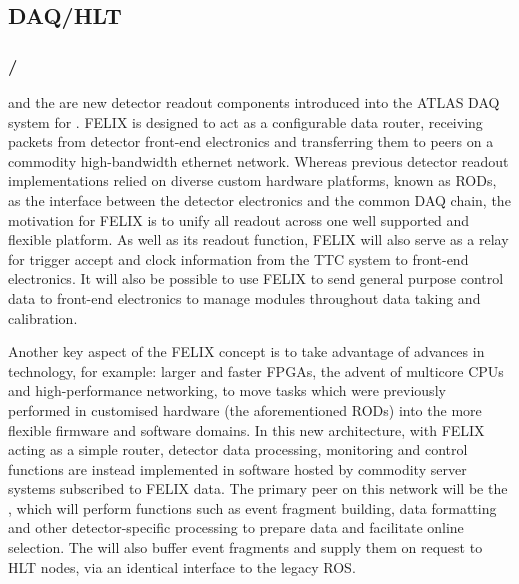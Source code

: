 \documentclass[cernpreprint, atlasdraft=false, UKenglish,british,orcidlogo, texmf, orcidlogo]{atlasdoc}
\begin{document}
\subsection{DAQ/HLT}
 
\subsubsection{/}
\label{subsubsec:tdaq_daqhlt_felixswrod}
 and the  are new detector readout components introduced into the ATLAS \gls{DAQ} system for \RunThr. \gls{FELIX} is designed to act as a configurable data router, receiving packets from detector front-end electronics and transferring them to peers on a commodity high-bandwidth ethernet network. Whereas previous detector readout implementations relied on diverse custom hardware platforms, known as \glspl{ROD}, as the interface between the detector electronics and the common \gls{DAQ} chain, the motivation for \gls{FELIX} is to unify all readout across one well supported and flexible platform. As well as its readout function, \gls{FELIX} will also serve as a relay for trigger accept and clock information from the \gls{TTC} system to front-end electronics. It will also be possible to use \gls{FELIX} to send general purpose control data to front-end electronics to manage modules throughout data taking and calibration.
 
Another key aspect of the \gls{FELIX} concept is to take advantage of advances in technology, for example: larger and faster \glspl{FPGA}, the advent of multicore \glspl{CPU} and high-performance networking, to move tasks which were previously performed in customised hardware (the aforementioned \glspl{ROD}) into the more flexible firmware and software domains. In this new architecture, with \gls{FELIX} acting as a simple router, detector data processing, monitoring and control functions are instead implemented in software hosted by commodity server systems subscribed to \gls{FELIX} data. The primary peer on this network will be the \swrod, which will perform functions such as event fragment building, data formatting and other detector-specific processing to prepare data and facilitate online selection. The \swrod will also buffer event fragments and supply them on request to \gls{HLT} nodes, via an identical interface to the legacy \gls{ROS}.
 
\end{document}
